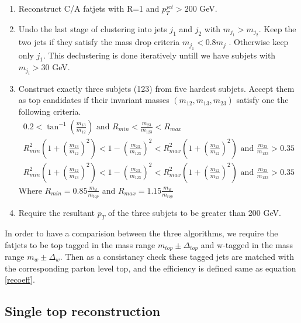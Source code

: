 \documentclass[12pt,a4paper]{article}		%
\begin{document}
\begin{enumerate}
	\item Reconstruct C/A fatjets with R=1 and $p_T^{jet} > 200$ GeV. 
	\item Undo the last stage of clustering into jets $j_1$ and $j_2$ with $m_{j_1} > m_{j_2}$. Keep the two jets if they satisfy the mass drop criteria $m_{j_1} < 0.8 m_j$ . Otherwise keep only $j_1$. This declustering is done iteratively untill we have subjets with $m_{j_i} > 30$ GeV.
	\item Construct exactly three subjets (123) from five hardest subjets. Accept them as top candidates if their invariant masses $(m_{12}, m_{13}, m_{23})$ satisfy one the following criteria. 
	\begin{eqnarray*}	
	0.2 < \tan^{-1} \left(\frac{m_{13}}{m_{12}} \right) \text{  and } R_{min} < \frac{m_{23}}{m_{123}} < R_{max} \\
	R_{min}^2 \left( 1 + \left( \frac{m_{13}}{m_{12}} \right)^2 \right) < 1 - \left(\frac{m_{23}}{m_{123}} \right)^2 < R_{max}^2 \left( 1 + \left( \frac{m_{13}}{m_{12}} \right)^2 \right) \text{  and } \frac{m_{23}}{m_{123}} > 0.35\\
	R_{min}^2 \left( 1 + \left( \frac{m_{12}}{m_{13}} \right)^2 \right) < 1 - \left(\frac{m_{23}}{m_{123}} \right)^2 < R_{max}^2 \left( 1 + \left( \frac{m_{12}}{m_{13}} \right)^2 \right) \text{  and } \frac{m_{23}}{m_{123}} > 0.35
	\end{eqnarray*}
	Where $R_{min} = 0.85 \frac{m_w}{m_{top}}$ and $R_{max} = 1.15 \frac{m_w}{m_{top}}$ 
	\item Require the resultant $p_T$ of the three subjets to be greater than 200 GeV.
\end{enumerate}

In order to have a comparision between the three algorithms, we require the fatjets to be top tagged in the mass range $m_{top} \pm \Delta_{top}$ and w-tagged in the mass range $m_{w} \pm \Delta_{w}$. Then as a consistancy check these tagged jets are matched with the corresponding parton level top, and the efficiency is defined same as equation \ref{recoeff}.
     

\subsection{Single top reconstruction}
\end{document}
